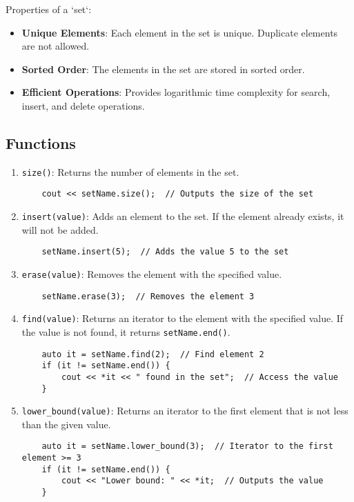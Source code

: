\documentclass{article}
\begin{document}
\noindent Properties of a `set`:
\begin{itemize}
    \item \textbf{Unique Elements}: Each element in the set is unique. Duplicate elements are not allowed.
    \item \textbf{Sorted Order}: The elements in the set are stored in sorted order.
    \item \textbf{Efficient Operations}: Provides logarithmic time complexity for search, insert, and delete operations.
\end{itemize}

\subsection{Functions}

\begin{enumerate}
    \item \texttt{size()}: Returns the number of elements in the set.
    \begin{lstlisting}
    cout << setName.size();  // Outputs the size of the set
    \end{lstlisting}

    \item \texttt{insert(value)}: Adds an element to the set. If the element already exists, it will not be added.
    \begin{lstlisting}
    setName.insert(5);  // Adds the value 5 to the set
    \end{lstlisting}

    \item \texttt{erase(value)}: Removes the element with the specified value.
    \begin{lstlisting}
    setName.erase(3);  // Removes the element 3
    \end{lstlisting}

    \item \texttt{find(value)}: Returns an iterator to the element with the specified value. If the value is not found, it returns \texttt{setName.end()}.
    \begin{lstlisting}
    auto it = setName.find(2);  // Find element 2
    if (it != setName.end()) {
        cout << *it << " found in the set";  // Access the value
    }
    \end{lstlisting}

    \item \texttt{lower\_bound(value)}: Returns an iterator to the first element that is not less than the given value.
    \begin{lstlisting}
    auto it = setName.lower_bound(3);  // Iterator to the first element >= 3
    if (it != setName.end()) {
        cout << "Lower bound: " << *it;  // Outputs the value
    }
    \end{lstlisting}


\end{enumerate}
\end{document}
